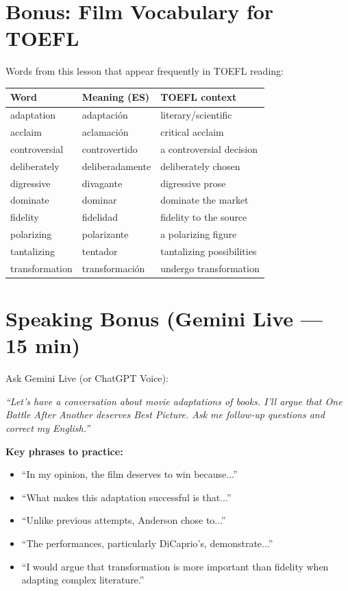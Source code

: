 \documentclass[10pt,a4paper]{article}
\begin{document}
\section*{Bonus: Film Vocabulary for TOEFL}

Words from this lesson that appear frequently in TOEFL reading:

\begin{center}
\begin{tabular}{lll}
\toprule
\textbf{Word} & \textbf{Meaning (ES)} & \textbf{TOEFL context} \\
\midrule
adaptation & adaptaci\'on & literary/scientific \\
acclaim & aclamaci\'on & critical acclaim \\
controversial & controvertido & a controversial decision \\
deliberately & deliberadamente & deliberately chosen \\
digressive & divagante & digressive prose \\
dominate & dominar & dominate the market \\
fidelity & fidelidad & fidelity to the source \\
polarizing & polarizante & a polarizing figure \\
tantalizing & tentador & tantalizing possibilities \\
transformation & transformaci\'on & undergo transformation \\
\bottomrule
\end{tabular}
\end{center}

\section*{Speaking Bonus (Gemini Live --- 15 min)}

\begin{tcolorbox}[colback=white, colframe=black]
Ask Gemini Live (or ChatGPT Voice):

\textit{``Let's have a conversation about movie adaptations of books.
I'll argue that One Battle After Another deserves Best Picture.
Ask me follow-up questions and correct my English.''}

\textbf{Key phrases to practice:}
\begin{itemize}[nosep]
\item ``In my opinion, the film deserves to win because...''
\item ``What makes this adaptation successful is that...''
\item ``Unlike previous attempts, Anderson chose to...''
\item ``The performances, particularly DiCaprio's, demonstrate...''
\item ``I would argue that transformation is more important than
fidelity when adapting complex literature.''
\end{itemize}
\end{tcolorbox}
\end{document}
